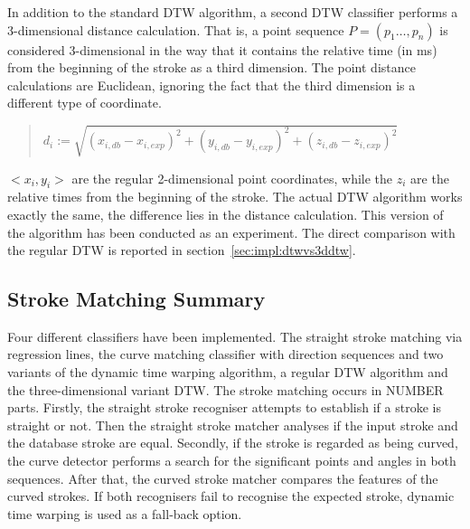 In addition to the standard DTW algorithm, a second DTW classifier performs 
a 3-dimensional distance calculation.
That is, a point sequence \(P = (p_{1}\ldots,p_{n})\) is considered 
3-dimensional in the way that it contains the relative time (in ms) from the
beginning of the stroke as a third dimension.
The point distance calculations are Euclidean, ignoring the fact that the
third dimension is a different type of coordinate.
\begin{quote}
\(
  d_i := \sqrt{(x_{i,db}-x_{i,exp})^2+(y_{i,db}-y_{i,exp})^2+(z_{i,db}-z_{i,exp})^2} 
\)
\end{quote}
\(<x_i, y_i>\) are the regular 2-dimensional point coordinates, 
while the \(z_i\) are the relative times from the beginning of the stroke.
The actual DTW algorithm works exactly the same, the difference lies in 
the distance calculation.
This version of the algorithm has been conducted as an experiment. The direct
comparison with the regular DTW is reported in 
section~\ref{sec:impl:dtwvs3ddtw}.


\subsection{Stroke Matching Summary}
\label{sec:hwre:strokematchingsummary}

Four different classifiers have been implemented.
The straight stroke matching via regression lines,
the curve matching classifier with direction sequences and two variants
of the dynamic time warping algorithm, a regular DTW algorithm and the 
three-dimensional variant DTW.
The stroke matching occurs in NUMBER parts. 
Firstly, the straight stroke recogniser attempts to establish if a stroke 
is straight or not. Then the straight stroke matcher analyses if the input
stroke and the database stroke are equal.
Secondly, if the stroke is regarded as being curved, the curve detector 
performs a search for the significant points and angles in both sequences.
After that, the curved stroke matcher compares the features of the curved
strokes. If both recognisers fail to recognise the expected stroke, 
dynamic time warping is used as a fall-back option.

